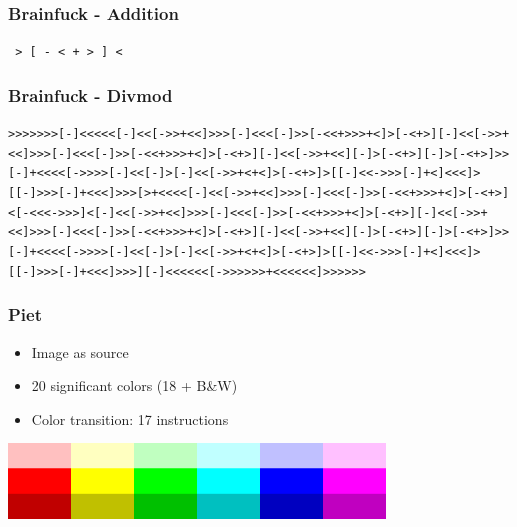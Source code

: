 \documentclass[17pt]{beamer}
\renewcommand{\(}[1]{\begin{columns}[#1]}
\renewcommand{\)}{\end{columns}}
\newcommand{\<}[1]{\begin{column}{#1}}
\renewcommand{\>}{\end{column}}
\begin{document}
\begin{frame}
  \frametitle{Brainfuck - Addition}
  \pause
  \begin{center}
    \texttt{~>~[~-~<~+~>~]~<~}
  \end{center}
\end{frame}

\begin{frame}
  \frametitle{Brainfuck - Divmod}
  \pause
  \texttt{\tiny >>>>>>>[-]<<<<<[-]<<[->>+<<]>>>[-]<<<[-]>>[-<<+>>>+<]>[-<+>][-]<<[->>+<<]>>>[-]<<<[-]>>[-<<+>>>+<]>[-<+>][-]<<[->>+<<][-]>[-<+>][-]>[-<+>]>>[-]+<<<<[->>>>[-]<<[-]>[-]<<[->>+<+<]>[-<+>]>[[-]<<->>>[-]+<]<<<]>[[-]>>>[-]+<<<]>>>[>+<<<<[-]<<[->>+<<]>>>[-]<<<[-]>>[-<<+>>>+<]>[-<+>]<[-<<<->>>]<[-]<<[->>+<<]>>>[-]<<<[-]>>[-<<+>>>+<]>[-<+>][-]<<[->>+<<]>>>[-]<<<[-]>>[-<<+>>>+<]>[-<+>][-]<<[->>+<<][-]>[-<+>][-]>[-<+>]>>[-]+<<<<[->>>>[-]<<[-]>[-]<<[->>+<+<]>[-<+>]>[[-]<<->>>[-]+<]<<<]>[[-]>>>[-]+<<<]>>>][-]<<<<<<[->>>>>>+<<<<<<]>>>>>>}
\end{frame}




\begin{frame}
  \frametitle{Piet}
  \begin{itemize}
  \item Image as source
  \item 20 significant colors (18 + B\&W)
  \item Color transition: 17 instructions
  \end{itemize}
  \begin{center}
    \includegraphics[width=10cm]{img/rainbow}\\~\\
  \end{center}
\end{frame}
\end{document}

